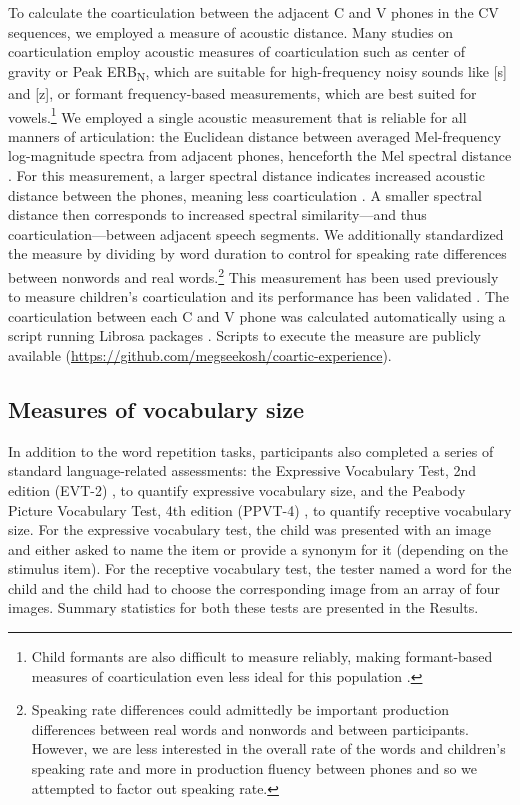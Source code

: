 \documentclass[a4paper,man,natbib,donotrepeattitle, apacite]{apa6}
\begin{document}
To calculate the coarticulation between the adjacent C and V phones in the CV sequences, we employed a measure of acoustic distance. Many studies on coarticulation employ acoustic measures of coarticulation such as center of gravity or Peak ERB\textsubscript{N}, which are suitable for high-frequency noisy sounds like [s] and [z], or formant frequency-based measurements, which are best suited for vowels.\footnote{Child formants are also difficult to measure reliably, making formant-based measures of coarticulation even less ideal for this population \cite{leeAcousticsChildrenSpeech1999}.} We employed a single acoustic measurement that is reliable for all manners of articulation: the Euclidean distance between averaged Mel-frequency log-magnitude spectra from adjacent phones, henceforth the Mel spectral distance \cite{cychoszSpectralTemporalMeasures2019,gerosaAnalyzingChildrenSpeech2006}. For this measurement, a larger spectral distance indicates increased acoustic distance between the phones, meaning less coarticulation \cite{gerosaAnalyzingChildrenSpeech2006}. A smaller spectral distance then corresponds to increased spectral similarity---and thus coarticulation---between adjacent speech segments. We additionally standardized the measure by dividing by word duration to control for speaking rate differences between nonwords and real words.\footnote{Speaking rate differences could admittedly be important production differences between real words and nonwords and between participants. However, we are less interested in the overall rate of the words and children’s speaking rate and more in production fluency between phones and so we attempted to factor out speaking rate.} This measurement has been used previously to measure children’s coarticulation \cite{gerosaAnalyzingChildrenSpeech2006} and its performance has been validated \cite{cychoszSpectralTemporalMeasures2019}. The coarticulation between each C and V phone was calculated automatically using a script running Librosa packages \cite{mcfeeLibrosaAudioMusic2015}. Scripts to execute the measure are publicly available (\url{https://github.com/megseekosh/coartic-experience}). 

\subsection{Measures of vocabulary size}

In addition to the word repetition tasks, participants also completed a series of standard language-related assessments: the Expressive Vocabulary Test, 2nd edition (EVT-2) \cite{williamsExpressiveVocabularyTest2007}, to quantify expressive vocabulary size, and the Peabody Picture Vocabulary Test, 4th edition (PPVT-4) \cite{dunnPPVT4PeabodyPicture2007}, to quantify receptive vocabulary size. For the expressive vocabulary test, the child was presented with an image and either asked to name the item or provide a synonym for it (depending on the stimulus item). For the receptive vocabulary test, the tester named a word for the child and the child had to choose the corresponding image from an array of four images. Summary statistics for both these tests are presented in the Results.
\end{document}

